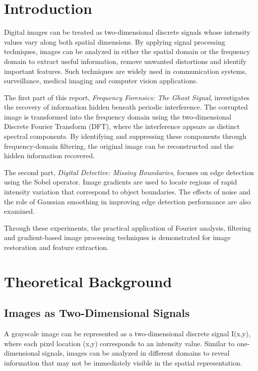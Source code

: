\documentclass[10pt, a4paper, twocolumn]{article}
\begin{document}
\section{Introduction}
Digital images can be treated as two-dimensional discrete signals whose intensity values vary along both spatial dimensions. By applying signal processing techniques, images can be analyzed in either the spatial domain or the frequency domain to extract useful information, remove unwanted distortions and identify important features. Such techniques are widely used in communication systems, surveillance, medical imaging and computer vision applications.

The first part of this report, \textit{Frequency Forensics: The Ghost Signal}, investigates the recovery of information hidden beneath periodic interference. The corrupted image is transformed into the frequency domain using the two-dimensional Discrete Fourier Transform (DFT), where the interference appears as distinct spectral components. By identifying and suppressing these components through frequency-domain filtering, the original image can be reconstructed and the hidden information recovered.

The second part, \textit{Digital Detective: Missing Boundaries}, focuses on edge detection using the Sobel operator. Image gradients are used to locate regions of rapid intensity variation that correspond to object boundaries. The effects of noise and the role of Gaussian smoothing in improving edge detection performance are also examined.

Through these experiments, the practical application of Fourier analysis, filtering and gradient-based image processing techniques is demonstrated for image restoration and feature extraction.




\section{Theoretical Background}

\subsection{Images as Two-Dimensional Signals}
A grayscale image can be represented as a two-dimensional discrete signal I(x,y), where each pixel location (x,y) corresponds to an intensity value. Similar to one-dimensional signals, images can be analyzed in different domains to reveal information that may not be immediately visible in the spatial representation.
\end{document}
